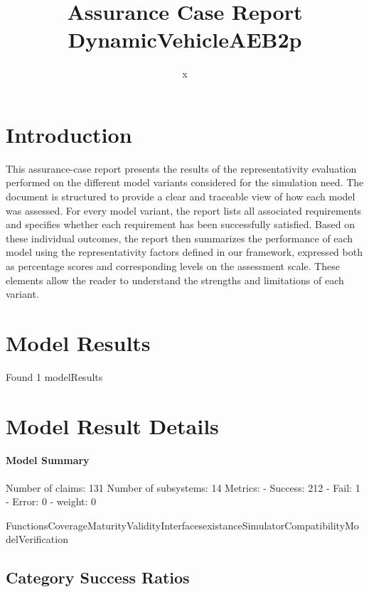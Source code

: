 \documentclass{article}
\title{Assurance Case Report DynamicVehicleAEB2p}
\author{x}
\begin{document}
	\maketitle
	\section{Introduction}
	This assurance-case report presents the results of the 
	representativity evaluation performed on the different model variants considered for 
	the simulation need. The document is structured to provide a clear and traceable view of how 
	each model was assessed. For every model variant, the report lists all associated requirements
	 and specifies whether each requirement has been successfully satisfied. Based on these 
	individual outcomes, the report then summarizes the performance of each model using the 
	representativity factors defined in our framework, expressed both as percentage scores 
	and corresponding levels on the assessment scale. These elements allow the reader to understand 
	the strengths and limitations of each variant.
	 
	\section{Model Results}
    Found 1 modelResults
		
			\section{Model Result Details} 
			\paragraph{Model Summary}
			Number of claims: 131
			Number of subsystems: 14
			Metrics:
			- Success: 212
			- Fail: 1
			- Error: 0
			- weight: 0
			
			FunctionsCoverageMaturityValidityInterfacesexistanceSimulatorCompatibilityModelVerification

					\subsection{Category Success Ratios}
						
\end{document}
